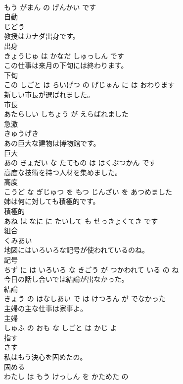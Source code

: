 \documentclass[8pt]{extreport}
\begin{document}
\begin{CJK}{UTF8}{min}
\\	もう がまん の げんかい です			
\\	自動	
\\	じどう			
\\	教授はカナダ出身です。	
\\	出身 
\\	きょうじゅ は かなだ しゅっしん です			
\\	この仕事は来月の下旬には終わります。	
\\	下旬 
\\	この しごと は らいげつ の げじゅん に は おわります			
\\	新しい市長が選ばれました。	
\\	市長 
\\	あたらしい しちょう が えらばれました			
\\	急激	
\\	きゅうげき			
\\	あの巨大な建物は博物館です。	
\\	巨大 
\\	あの きょだい な たてもの は はくぶつかん です			
\\	高度な技術を持つ人材を集めました。	
\\	高度 
\\	こうど な ぎじゅつ を もつ じんざい を あつめました			
\\	姉は何に対しても積極的です。	
\\	積極的 
\\	あね は なに に たいして も せっきょくてき です			
\\	組合	
\\	くみあい			
\\	地図にはいろいろな記号が使われているのね。	
\\	記号 
\\	ちず に は いろいろ な きごう が つかわれて いる の ね			
\\	今日の話し合いでは結論が出なかった。	
\\	結論 
\\	きょう の はなしあい で は けつろん が でなかった			
\\	主婦の主な仕事は家事よ。	
\\	主婦 
\\	しゅふ の おも な しごと は かじ よ			
\\	指す	
\\	さす			
\\	私はもう決心を固めたの。	
\\	固める 
\\	わたし は もう けっしん を かためた の			

\end{CJK}
\end{document}

